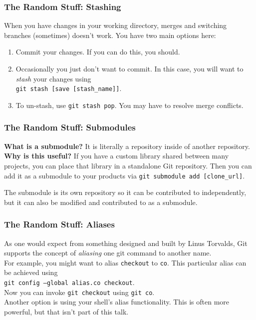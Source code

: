 \documentclass{beeper}
\begin{document}
\begin{frame}
    \frametitle{The Random Stuff: Stashing}

    When you have changes in your working directory, merges and switching branches (sometimes)
    doesn't work. You have two main options here:

    \begin{enumerate}
        \item Commit your changes. If you can do this, you should.
        \item Occasionally you just don't want to commit. In this case, you will want to
            \textit{stash} your changes using\\ \texttt{git stash [save [stash\_name]]}.
        \item To un-stash, use \texttt{git stash pop}. You may have to resolve merge conflicts.
    \end{enumerate}
\end{frame}

\begin{frame}
    \frametitle{The Random Stuff: Submodules}

    \textbf{What is a submodule?} It is literally a repository inside of another repository.\\

    \textbf{Why is this useful?} If you have a custom library shared between many projects, you can
    place that library in a standalone Git repository. Then you can add it as a submodule to your
    products via \texttt{git submodule add [clone\_url]}.

    The submodule is its own repository so it can be contributed to independently, but it can also
    be modified and contributed to as a submodule.
\end{frame}

\begin{frame}
    \frametitle{The Random Stuff: Aliases}

    As one would expect from something designed and built by Linus Torvalds, Git supports the
    concept of \textit{aliasing} one git command to another name.\\

    For example, you might want to alias \texttt{checkout} to \texttt{co}. This particular alias can
    be achieved using \\ \texttt{git config --global alias.co checkout}.\\

    Now you can invoke \texttt{git checkout} using \texttt{git co}.\\

    Another option is using your shell's alias functionality. This is often more powerful, but that
    isn't part of this talk.
\end{frame}
\end{document}
